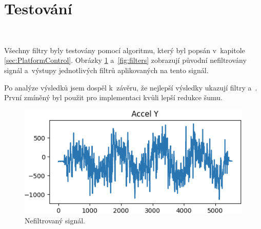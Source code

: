 \section{Testování}\

Všechny filtry byly testovány pomocí algoritmu, který byl popsán v~kapitole
\ref{sec:PlatformControl}. Obrázky \ref{fig:NoFilter} a~\ref{fig:filters} zobrazují
původní nefiltrovány signál a~výstupy jednotlivých filtrů aplikovaných na tento
signál.

Po analýze výsledků jsem dospěl k~závěru, že nejlepší výsledky ukazují filtry
 a~. První zmíněný byl 
použit pro implementaci kvůli lepší redukce šumu.

\begin{figure}[!h]
	\centering
    \includegraphics[width = 0.7\linewidth]{Figures/NoFilter.png}
    \caption{Nefiltrovaný signál.}
    \label{fig:NoFilter}
\end{figure}

